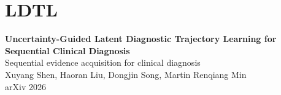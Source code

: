 \documentclass[11pt,notheorems,hyperref={pdfauthor=whatever}]{beamer}
\begin{document}
\section{LDTL}

\begin{frame}[t]
\vspace{2.1em}
\begin{center}
{\Large\bfseries Uncertainty-Guided Latent Diagnostic Trajectory Learning for Sequential Clinical Diagnosis}\\[0.7em]
{\normalsize\color{AccentOrange}Sequential evidence acquisition for clinical diagnosis}\\[1.0em]
{\small Xuyang Shen, Haoran Liu, Dongjin Song, Martin Renqiang Min}\\[0.25em]
{\small arXiv 2026}
\end{center}
\end{frame}
\end{document}

